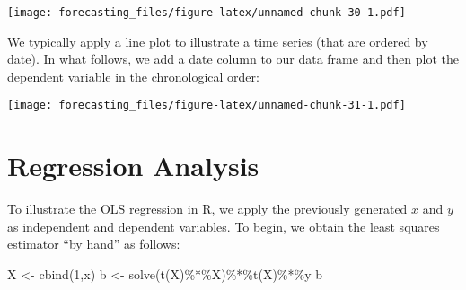 \documentclass[
  oneside]{book}
\newenvironment{Shaded}{\begin{snugshade}}{\end{snugshade}}
\newcommand{\AttributeTok}[1]{\textcolor[rgb]{0.77,0.63,0.00}{#1}}
\newcommand{\DecValTok}[1]{\textcolor[rgb]{0.00,0.00,0.81}{#1}}
\newcommand{\FunctionTok}[1]{\textcolor[rgb]{0.00,0.00,0.00}{#1}}
\newcommand{\NormalTok}[1]{#1}
\newcommand{\OtherTok}[1]{\textcolor[rgb]{0.56,0.35,0.01}{#1}}
\newcommand{\SpecialCharTok}[1]{\textcolor[rgb]{0.00,0.00,0.00}{#1}}
\newcommand{\StringTok}[1]{\textcolor[rgb]{0.31,0.60,0.02}{#1}}
\begin{document}
\texttt{[image: forecasting\_files/figure-latex/unnamed-chunk-30-1.pdf]}

We typically apply a line plot to illustrate a time series (that are ordered by date). In what follows, we add a date column to our data frame and then plot the dependent variable in the chronological order:

\begin{Shaded}
\end{Shaded}

\texttt{[image: forecasting\_files/figure-latex/unnamed-chunk-31-1.pdf]}

\hypertarget{regression-analysis}{%
\section*{Regression Analysis}\label{regression-analysis}}

To illustrate the OLS regression in R, we apply the previously generated \(x\) and \(y\) as independent and dependent variables. To begin, we obtain the least squares estimator ``by hand'' as follows:

\begin{Shaded}
\begin{Highlighting}[]
\NormalTok{X }\OtherTok{\textless{}{-}} \FunctionTok{cbind}\NormalTok{(}\DecValTok{1}\NormalTok{,x)}
\NormalTok{b }\OtherTok{\textless{}{-}} \FunctionTok{solve}\NormalTok{(}\FunctionTok{t}\NormalTok{(X)}\SpecialCharTok{\%*\%}\NormalTok{X)}\SpecialCharTok{\%*\%}\FunctionTok{t}\NormalTok{(X)}\SpecialCharTok{\%*\%}\NormalTok{y}
\NormalTok{b}
\end{Highlighting}
\end{Shaded}
\end{document}
